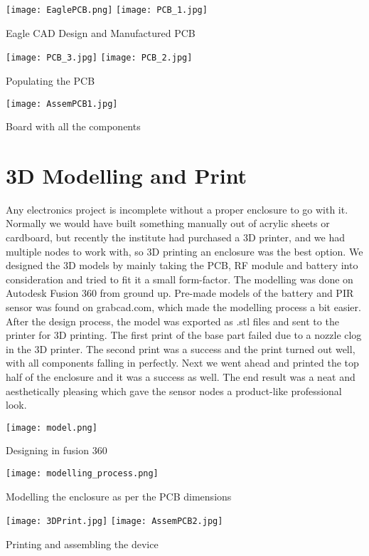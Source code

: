 \begin{center}
		\texttt{[image: EaglePCB.png]}		
		\hspace{10pt}
		\texttt{[image: PCB\_1.jpg]}
		
		Eagle CAD Design and Manufactured PCB
		
		\texttt{[image: PCB\_3.jpg]}		
		\texttt{[image: PCB\_2.jpg]}		
		
		Populating the PCB
		
		\vspace{20pt}
		\texttt{[image: AssemPCB1.jpg]}
		
		Board with all the components
		
		
\end{center}

\section{3D Modelling and Print}
Any electronics project is incomplete without a proper enclosure to go with it. Normally we would have built something manually out of acrylic sheets or cardboard, but recently the institute had purchased a 3D printer, and we had multiple nodes to work with, so 3D printing an enclosure was the best option. 
We designed the 3D models by mainly taking the PCB, RF module and battery into consideration and tried to fit it a small form-factor. The modelling was done on Autodesk Fusion 360 from ground up. Pre-made models of the battery and PIR sensor was found on grabcad.com, which made the modelling process a bit easier.
After the design process, the model was exported as .stl files and sent to the printer for 3D printing. The first print of the base part failed due to a nozzle clog in the 3D printer. The second print was a success and the print turned out well, with all components falling in perfectly. Next we went ahead and printed the top half of the enclosure and it was a success as well.
The end result was a neat and aesthetically pleasing which gave the sensor nodes a product-like professional look.

\begin{center}
	\texttt{[image: model.png]}
	
	Designing in fusion 360	
	\vspace{15pt}
	
	\texttt{[image: modelling\_process.png]}
	
	Modelling the enclosure as per the PCB dimensions
	\vspace{15pt}
	
	\texttt{[image: 3DPrint.jpg]}
	\texttt{[image: AssemPCB2.jpg]}
	
	Printing and assembling the device
\end{center}

